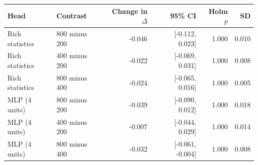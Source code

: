 \begin{tabular}{llrrrr}
\toprule
Head & Contrast & Change in $\Delta$ & 95\% CI & Holm $p$ & SD \\
\midrule
Rich statistics & 800 minus 200 & -0.046 & [-0.112, 0.023] & 1.000 & 0.010 \\
Rich statistics & 400 minus 200 & -0.022 & [-0.069, 0.031] & 1.000 & 0.008 \\
Rich statistics & 800 minus 400 & -0.024 & [-0.065, 0.016] & 1.000 & 0.005 \\
MLP (4 units) & 800 minus 200 & -0.039 & [-0.090, 0.012] & 1.000 & 0.018 \\
MLP (4 units) & 400 minus 200 & -0.007 & [-0.044, 0.029] & 1.000 & 0.014 \\
MLP (4 units) & 800 minus 400 & -0.032 & [-0.061, -0.004] & 1.000 & 0.008 \\
\bottomrule
\end{tabular}
